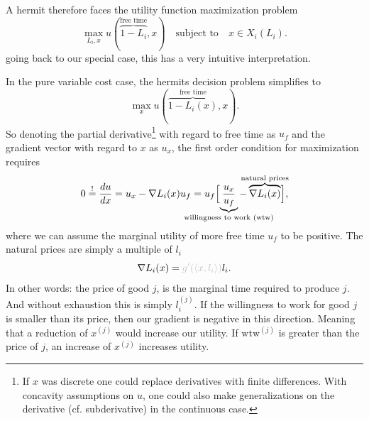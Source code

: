 A hermit therefore faces the utility function maximization problem
\[
	\max_{L_i, x} u(\overbrace{1-L_i}^{\text{free time}}, x)
	\quad\text{subject to}\quad x\in X_i(L_i).
\]
going back to our special case, this has a very intuitive interpretation.


\begin{example*}
	In the pure variable cost case, the hermits decision problem simplifies to
	\[
		\max_{x} u(\overbrace{1-L_i(x)}^{\text{free time}}, x).
	\]
	So denoting the partial derivative\footnote{
		If \(x\) was discrete one could replace derivatives with finite
		differences.  With concavity assumptions on \(u\), one could also make
		generalizations on the derivative (cf. subderivative) in the continuous
		case.
	}
	with regard to free time as \(u_f\) and
	the gradient vector with regard to \(x\) as \(u_x\), the first order
	condition for maximization requires
	\[
		0\overset!=\frac{du}{dx}
		= u_x - \nabla L_i(x) u_f
		= u_f \Bigl[
			\underbrace{\frac{u_x}{u_f}}_{\mathclap{\text{willingness to work (wtw)}}}
		- \overbrace{\nabla L_i(x)}^{\mathclap{\text{natural prices}}}
		\Bigr],
	\]
	where we can assume the marginal utility of more free time \(u_f\) to be
	positive. The natural prices are simply {\color{lightgray} a multiple of}
	\(l_i\)
	\[
		\nabla L_i(x) = {\color{lightgray} g'(\langle x, l_i\rangle) }l_i.
	\]
	In other words: the price of good \(j\), is the {\color{lightgray} marginal}
	time required to produce \(j\). And without exhaustion this is simply
	\(l^{(j)}_i\). If the willingness to work for good \(j\) is smaller than
	its price, then our gradient is negative in this direction. Meaning that
	a reduction of \(x^{(j)}\) would increase our utility. If \(\text{wtw}^{(j)}\) is
	greater than the price of \(j\), an increase of \(x^{(j)}\) increases utility.
\end{example*}